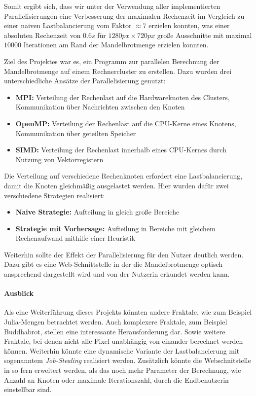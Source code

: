 Somit ergibt sich, dass wir unter der Verwendung aller implementierten Parallelisierungen eine Verbesserung
der maximalen Rechenzeit im Vergleich zu einer naiven Lastbalancierung vom Faktor \( \approx 7 \) erzielen konnten,
was einer absoluten Rechenzeit von \( 0.6s \) für \( 1280px \times 720px \) große Ausschnitte mit maximal \( 10000 \) Iterationen am Rand der Mandelbrotmenge erzielen konnten.

\pagebreak
Ziel des Projektes war es, ein Programm zur parallelen Berechnung der Mandelbrotmenge auf einem Rechnercluster zu erstellen.
Dazu wurden drei unterschiedliche Ansätze der Parallelisierung genutzt:
\begin{itemize}
	\item \textbf{MPI:} Verteilung der Rechenlast auf die Hardwareknoten des Clusters, Kommunikation über Nachrichten zwischen den Knoten
	\item \textbf{OpenMP:} Verteilung der Rechenlast auf die CPU-Kerne eines Knotens, Kommunikation über geteilten Speicher
	\item \textbf{SIMD:} Verteilung der Rechenlast innerhalb eines CPU-Kernes durch Nutzung von Vektorregistern
\end{itemize}

Die Verteilung auf verschiedene Rechenknoten erfordert eine Lastbalancierung, damit die Knoten gleichmäßig ausgelastet werden.
Hier wurden dafür zwei verschiedene Strategien realisiert:
\begin{itemize}
	\item \textbf{Naive Strategie:} Aufteilung in gleich große Bereiche
	\item \textbf{Strategie mit Vorhersage:} Aufteilung in Bereiche mit gleichem Rechenaufwand mithilfe einer Heuristik
\end{itemize}

Weiterhin sollte der Effekt der Parallelisierung für den Nutzer deutlich werden.
Dazu gibt es eine Web-Schnittstelle in der die Mandelbrotmenge optisch ansprechend dargestellt wird und von der Nutzerin erkundet werden kann.

\paragraph{Ausblick}
Als eine Weiterführung dieses Projekts könnten andere Fraktale,
wie zum Beispiel Julia-Mengen betrachtet werden.
Auch komplexere Fraktale, zum Beispiel Buddhabrot, stellen eine interessante Herausforderung dar. Sowie weitere Fraktale,
bei denen nicht alle Pixel unabhängig von einander berechnet werden können.
Weiterhin könnte eine dynamische Variante der Lastbalancierung mit sogenanntem \textit{Job-Stealing} realisiert werden.
Zusätzlich könnte die Webschnitstelle in so fern erweitert werden, als das noch mehr
Parameter der Berechnung, wie Anzahl an Knoten oder maximale Iterationszahl, durch die Endbenutzerin einstellbar sind.
